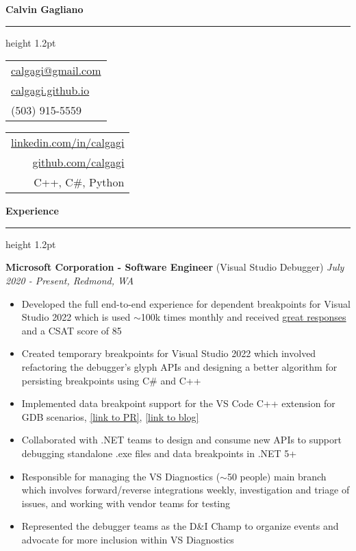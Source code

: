 \documentclass[11pt,letterpaper,ragged2e,withhyper]{dodiresume}
\def\hrulefill{\leavevmode\leaders\hrule height 1.2pt\hfill\kern\z}
\begin{document}
\noindent \LARGE \textbf{Calvin Gagliano } \hrulefill
\small
\vskip 0.1in

\setlength{\tabcolsep}{2.5em} %
\noindent \sffamily%
{\small\begin{tabular}[c]{l}
	  \tab \href{mailto:calgagi@gmail.com}{calgagi@gmail.com} \\
	    \tab \href{https://calgagi.github.io}{calgagi.github.io} \\
	      \tab (503) 915-5559
\end{tabular}}\hfill%
{\small\begin{tabular}[c]{r}
	  \href{https://linkedin.com/in/calgagi}{linkedin.com/in/calgagi} \tab \\
	    \href{https://github.com/calgagi}{github.com/calgagi} \tab \\
	      C++, C\#, Python \tab
\end{tabular}}%

\vskip 0.1in

\noindent\large \textbf{Experience } \hrulefill
\vskip 0.1in

\noindent \normalsize \textbf{Microsoft Corporation - Software Engineer} \footnotesize (Visual Studio Debugger) \hfill \small \textit{July 2020 - Present, Redmond, WA}
\begin{itemize}
	\item Developed the full end-to-end experience for dependent breakpoints for Visual Studio 2022 which is used $\sim$100k times monthly and received \href{https://twitter.com/VS_Debugger/status/1437902110822047750}{great responses} and a CSAT score of 85
	\item Created temporary breakpoints for Visual Studio 2022 which involved refactoring the debugger's glyph APIs and designing a better algorithm for persisting breakpoints using C\# and C++
	\item Implemented data breakpoint support for the VS Code C++ extension for GDB scenarios, \href{https://github.com/microsoft/MIEngine/pull/1257}{[link to PR]}, \href{https://devblogs.microsoft.com/cppblog/whats-new-for-c-debugging-in-visual-studio-code/#data-breakpoints}{[link to blog]}
	\item Collaborated with .NET teams to design and consume new APIs to support debugging standalone .exe files and data breakpoints in .NET 5+
	\item Responsible for managing the VS Diagnostics ($\sim$50 people) main branch which involves forward/reverse integrations weekly, investigation and triage of issues, and working with vendor teams for testing
	\item Represented the debugger teams as the D\&I Champ to organize events and advocate for more inclusion within VS Diagnostics
\end{itemize}
\end{document}
